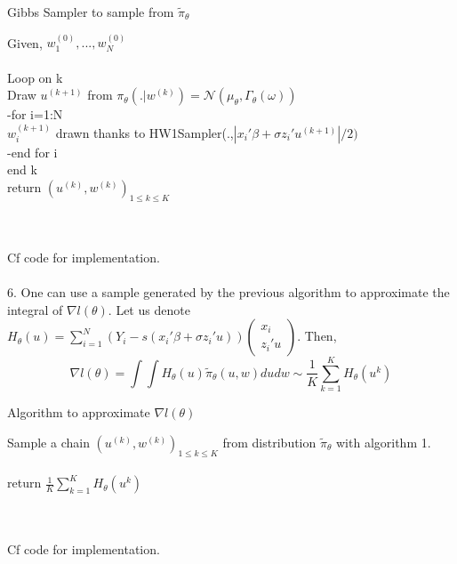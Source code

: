 \begin{algorithm}
	\caption{Gibbs Sampler to sample from $\tilde{\pi}_{\theta}$}\label{RS}
	Given, $w_{1}^{(0)}, ..., w_{N}^{(0)}$~\\
	~\\
	Loop on k~\\
	Draw $u^{(k+1)}$ from $\pi_{\theta}(. | w^{(k)}) = \mathcal{N}(\mu_{\theta},\Gamma_{\theta}(\omega))$~\\
	-for i=1:N~\\
	$w_{i}^{(k+1)}$ drawn thanks to HW1Sampler(.,$|x_i'\beta + \sigma z_i' u^{(k+1)}|/2)$\\
	-end for i~\\
	end k~\\
	return $(u^{(k)},w^{(k)})_{1\leq k \leq K}$
\end{algorithm}~\\
~\\
Cf code for implementation.~\\
~\\
6. One can use a sample generated by the previous algorithm to approximate the integral of $\nabla l(\theta)$.
Let us denote $H_{\theta}(u)=\sum_{i=1}^{N}(Y_i-s(x_i'\beta+\sigma z_i'u)) \left(
\begin{smallmatrix}
x_i\\ z_i'u
\end{smallmatrix}
\right)$. Then, 
$$\nabla l(\theta) = \int \int H_{\theta}(u)\tilde{\pi}_{\theta}(u,w)dudw   \sim \frac{1}{K}\sum_{k=1}^{K} H_{\theta}(u^k) $$
\begin{algorithm}
	\caption{Algorithm to approximate $ \nabla l(\theta)$}\label{RS}
	Sample a chain $(u^{(k)},w^{(k)})_{1\leq k \leq K}$ from distribution $\tilde{\pi}_{\theta}$ with algorithm 1.~\\
	~\\
	return $\frac{1}{K}\sum_{k=1}^{K} H_{\theta}(u^k)$
\end{algorithm}~\\
~\\	
Cf code for implementation.